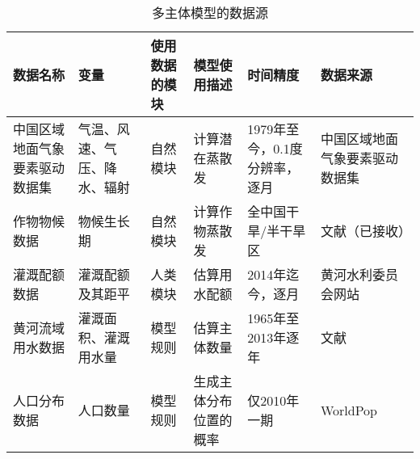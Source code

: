 \begin{table}[htbp]
    \centering
    \caption{多主体模型的数据源}
      \begin{tabularx}{\textwidth}{LLLLLL}
      \toprule
      数据名称  & 变量    & 使用数据的模块 & 模型使用描述 & 时间精度  & 数据来源 \\
      \midrule
      中国区域地面气象要素驱动数据集 & 气温、风速、气压、降水、辐射 & 自然模块  & 计算潜在蒸散发 & 1979年至今，0.1度分辨率，逐月 & 中国区域地面气象要素驱动数据集 \\
      作物物候数据 & 物候生长期 & 自然模块  & 计算作物蒸散发 & 全中国干旱/半干旱区 & 文献（已接收） \\
      灌溉配额数据 & 灌溉配额及其距平 & 人类模块  & 估算用水配额 & 2014年迄今，逐月 & 黄河水利委员会网站 \\
      黄河流域用水数据 & 灌溉面积、灌溉用水量 & 模型规则  & 估算主体数量 & 1965年至2013年逐年 & 文献\cite{zhou2020} \\
      人口分布数据 & 人口数量  & 模型规则  & 生成主体分布位置的概率 & 仅2010年一期 & WorldPop\cite{worldpop2020} \\
      \bottomrule
      \end{tabularx}%
    \label{ch6:tab:dataset}%
  \end{table}%
  